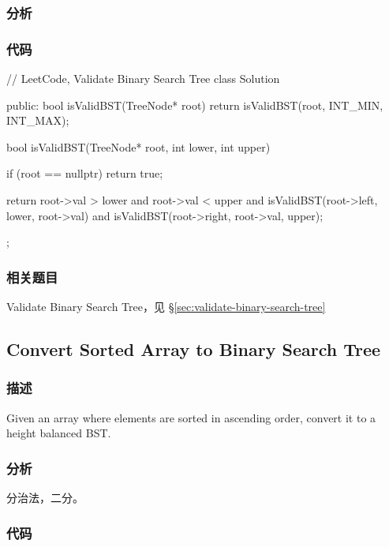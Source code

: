\subsubsection{分析}


\subsubsection{代码}

\begin{Code}
// LeetCode, Validate Binary Search Tree
class Solution {
public:
    bool isValidBST(TreeNode* root) {
        return isValidBST(root, INT_MIN, INT_MAX);
    }

    bool isValidBST(TreeNode* root, int lower, int upper) {
        if (root == nullptr) return true;

        return root->val > lower and root->val < upper
                and isValidBST(root->left, lower, root->val)
                and isValidBST(root->right, root->val, upper);
    }
};
\end{Code}


\subsubsection{相关题目}
\begindot
\item Validate Binary Search Tree，见 \S \ref{sec:validate-binary-search-tree}
\myenddot


\subsection{Convert Sorted Array to Binary Search Tree}
\label{sec:convert-sorted-array-to-binary-search-tree}


\subsubsection{描述}
Given an array where elements are sorted in ascending order, convert it to a height balanced BST.


\subsubsection{分析}
分治法，二分。


\subsubsection{代码}

